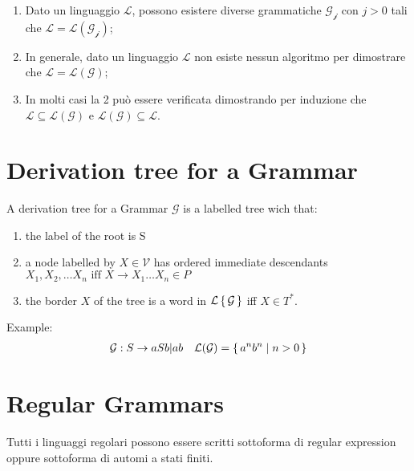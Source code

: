 \begin{enumerate}
\item Dato un linguaggio $\mathcal{L}$, possono esistere diverse grammatiche $\mathcal{G_j}$ con $j>0$ tali che $\mathcal{L = L(G_j)}$;
\item In generale, dato un linguaggio $\mathcal{L}$ non esiste nessun algoritmo per dimostrare che $\mathcal{L = L(G)}$;
\item In molti casi la 2 può essere verificata dimostrando per induzione che $\mathcal{L} \subseteq \mathcal{L(G)}$ e $\mathcal{L(G)} \subseteq \mathcal{L}$.
\end{enumerate}

\section{Derivation tree for a Grammar}
A derivation tree for a Grammar $\mathcal{G}$ is a labelled tree wich that:
\begin{enumerate}
\item the label of the root is S
\item a node labelled by $X \in \mathcal{V}$ has ordered immediate descendants \\ $X_1, X_2, \dots X_n \text{ iff } X \rightarrow X_1 \dots X_n \in P$
\item the border $X$ of the tree is a word in $\mathcal{L\set{G}}$ iff $X \in T^*$.
\end{enumerate}

\noindent
Example:
\[
\begin{aligned}
\mathcal{G}: S \rightarrow aSb | ab
\quad
\mathcal{L(G)} = \set{ a^nb^n | n > 0 }
\end{aligned}
\]


\section{Regular Grammars}
Tutti i linguaggi regolari possono essere scritti sottoforma di regular expression oppure sottoforma di automi a stati finiti.

